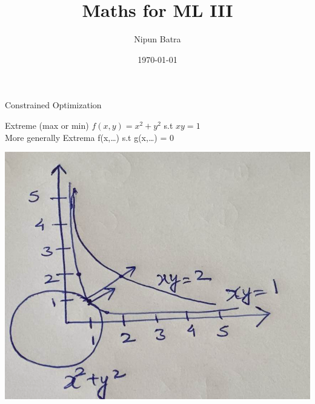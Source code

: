 \documentclass{beamer}
\title{Maths for ML III}
\date{\today}
\author{Nipun Batra}
\institute{IIT Gandhinagar}
\begin{document}
  \maketitle
  
  
  



    
    
    
    
    
    


\begin{frame}{Constrained Optimization}

Extreme (max or min) $f(x,y) = x^{2}+y^{2}$ s.t $xy=1$\\

\vspace{2em}
More generally Extrema f(x,\dots) s.t g(x,\dots) = 0
\pause \begin{center}
	\includegraphics[totalheight=6cm]{ml-maths/constrained.png}
\end{center}



\end{frame}
\end{document}
